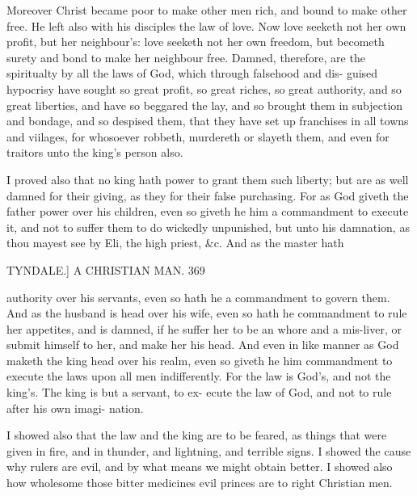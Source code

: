 \documentclass{custom}
\begin{document}
{Moreover Christ became poor to make other men rich, 
and bound to make other free. He left also with his 
disciples the law of love. Now love seeketh not her own 
profit, but her neighbour's: love seeketh not her own 
freedom, but becometh surety and bond to make her 
neighbour free. Damned, therefore, are the spiritualty 
by all the laws of God, which through falsehood and dis- 
guised hypocrisy have sought so great profit, so great 
riches, so great authority, and so great liberties, and have 
so beggared the lay, and so brought them in subjection 
and bondage, and so despised them, that they have set up 
franchises in all towns and viilages, for whosoever robbeth, 
murdereth or slayeth them, and even for traitors unto the 
king's person also. 

I proved also that no king hath power to grant them 
such liberty; but are as well damned for their giving, as 
they for their false purchasing. For as God giveth the 
father power over his children, even so giveth he him a 
commandment to execute it, and not to suffer them to do 
wickedly unpunished, but unto his damnation, as thou mayest 
see by Eli, the high priest, &c. And as the master hath 


TYNDALE.] A CHRISTIAN MAN. 369

authority over his servants, even so hath he a commandment 
to govern them. And as the husband is head over his wife, 
even so hath he commandment to rule her appetites, and is 
damned, if he suffer her to be an whore and a mis-liver, 
or submit himself to her, and make her his head. And
even in like manner as God maketh the king head over his
realm, even so giveth he him commandment to execute
the laws upon all men indifferently. For the law is God's,
and not the king's. The king is but a servant, to ex- 
ecute the law of God, and not to rule after his own imagi- 
nation. 

I showed also that the law and the king are to be 
feared, as things that were given in fire, and in thunder, 
and lightning, and terrible signs. I showed the cause why 
rulers are evil, and by what means we might obtain better. 
I showed also how wholesome those bitter medicines evil 
princes are to right Christian men. 

}
\end{document}
